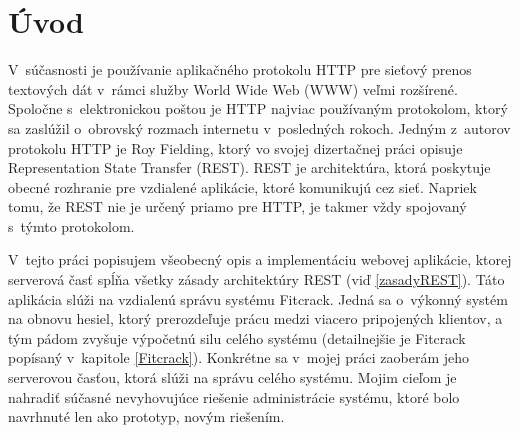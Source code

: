 \documentclass[slovak]{fitthesis}
\begin{document}
  \maketitle
  \setlength{\parskip}{0pt}

  {\hypersetup{hidelinks}\tableofcontents}
  
  \ifczech
    \renewcommand\listfigurename{Seznam obrázků}
  \fi
  \ifslovak
    \renewcommand\listfigurename{Zoznam obrázkov}
  \fi
  
  \ifczech
    \renewcommand\listtablename{Seznam tabulek}
  \fi
  \ifslovak
    \renewcommand\listtablename{Zoznam tabuliek}
  \fi

  \ifODSAZ
    \setlength{\parskip}{0.5\bigskipamount}
  \else
    \setlength{\parskip}{0pt}
  \fi

  \iftwoside
    \cleardoublepage
  \fi


\chapter{Úvod}\label{uvod}
V~súčasnosti je používanie aplikačného protokolu HTTP pre sieťový prenos textových dát v~rámci služby World Wide Web (WWW) veľmi rozšírené. Spoločne s~elektronickou poštou je HTTP najviac používaným protokolom, ktorý sa zaslúžil o~obrovský rozmach internetu v~posledných rokoch. Jedným z~autorov protokolu HTTP je Roy Fielding, ktorý vo svojej dizertačnej práci opisuje Representation State Transfer (REST). REST je architektúra, ktorá poskytuje obecné rozhranie pre vzdialené aplikácie, ktoré komunikujú cez sieť. Napriek tomu, že REST nie je určený priamo pre HTTP, je takmer vždy spojovaný s~týmto protokolom.

V~tejto práci popisujem všeobecný opis a implementáciu webovej aplikácie, ktorej serverová časť spĺňa všetky zásady architektúry REST (viď \ref{zasadyREST}). Táto aplikácia slúži na vzdialenú správu systému Fitcrack. Jedná sa o~výkonný systém na obnovu hesiel, ktorý prerozdeľuje prácu medzi viacero pripojených klientov, a tým pádom zvyšuje výpočetnú silu celého systému (detailnejšie je Fitcrack popísaný v~kapitole \ref{Fitcrack}). Konkrétne sa v~mojej práci zaoberám jeho serverovou časťou, ktorá slúži na správu celého systému. Mojim cieľom je nahradiť súčasné nevyhovujúce riešenie administrácie systému, ktoré bolo navrhnuté len ako prototyp, novým riešením.
\end{document}
